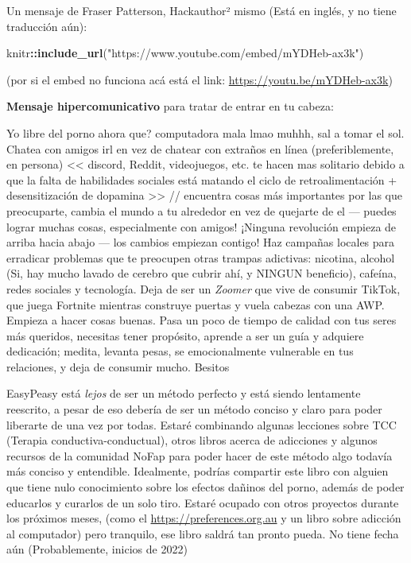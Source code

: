\documentclass[
  spanish,
  openany]{book}
\newenvironment{Shaded}{\begin{snugshade}}{\end{snugshade}}
\newcommand{\KeywordTok}[1]{\textcolor[rgb]{0.13,0.29,0.53}{\textbf{#1}}}
\newcommand{\NormalTok}[1]{#1}
\newcommand{\OperatorTok}[1]{\textcolor[rgb]{0.81,0.36,0.00}{\textbf{#1}}}
\newcommand{\StringTok}[1]{\textcolor[rgb]{0.31,0.60,0.02}{#1}}
\let\oldurl\url
\renewcommand\url{\renewcommand\UrlFont{\ttfamily\color{blue}}\oldurl}
\begin{document}
Un mensaje de Fraser Patterson, Hackauthor² mismo (Está en inglés, y no tiene traducción aún):

\begin{Shaded}
\begin{Highlighting}[]
\NormalTok{knitr}\OperatorTok{::}\KeywordTok{include\_url}\NormalTok{(}\StringTok{"https://www.youtube.com/embed/mYDHeb{-}ax3k"}\NormalTok{)}
\end{Highlighting}
\end{Shaded}

(por si el embed no funciona acá está el link: \url{https://youtu.be/mYDHeb-ax3k})

\textbf{Mensaje hipercomunicativo} para tratar de entrar en tu cabeza:

Yo libre del porno ahora que? \textbar\textbar\textbar{} computadora mala lmao muhhh, sal a tomar el sol. Chatea con amigos irl en vez de chatear con extraños en línea (preferiblemente, en persona) \textless\textless{} discord, Reddit, videojuegos, etc. te hacen mas solitario debido a que la falta de habilidades sociales está matando el ciclo de retroalimentación + desensitización de dopamina \textgreater\textgreater{} // encuentra cosas más importantes por las que preocuparte, cambia el mundo a tu alrededor en vez de quejarte de el --- puedes lograr muchas cosas, especialmente con amigos! ¡Ninguna revolución empieza de arriba hacia abajo --- los cambios empiezan contigo! Haz campañas locales para erradicar problemas que te preocupen \textbar\textbar{} otras trampas adictivas: nicotina, alcohol (Si, hay mucho lavado de cerebro que cubrir ahí, y NINGUN beneficio), cafeína, redes sociales y tecnología. Deja de ser un \emph{Zoomer} que vive de consumir TikTok, que juega Fortnite mientras construye puertas y vuela cabezas con una AWP. Empieza a hacer cosas buenas. Pasa un poco de tiempo de calidad con tus seres más queridos, necesitas tener propósito, aprende a ser un guía y adquiere dedicación; medita, levanta pesas, se emocionalmente vulnerable en tus relaciones, y deja de consumir mucho. Besitos

EasyPeasy está \emph{lejos} de ser un método perfecto y está siendo lentamente reescrito, a pesar de eso debería de ser un método conciso y claro para poder liberarte de una vez por todas. Estaré combinando algunas lecciones sobre TCC (Terapia conductiva-conductual), otros libros acerca de adicciones y algunos recursos de la comunidad NoFap para poder hacer de este método algo todavía más conciso y entendible. Idealmente, podrías compartir este libro con alguien que tiene nulo conocimiento sobre los efectos dañinos del porno, además de poder educarlos y curarlos de un solo tiro. Estaré ocupado con otros proyectos durante los próximos meses, (como el \url{https://preferences.org.au} y un libro sobre adicción al computador) pero tranquilo, ese libro saldrá tan pronto pueda. No tiene fecha aún (Probablemente, inicios de 2022)
\end{document}
